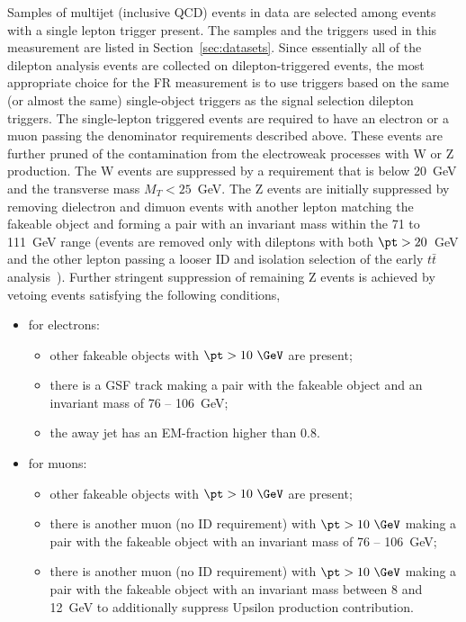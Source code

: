 Samples of multijet (inclusive QCD) events in data are selected among events with a single lepton trigger present.
The samples and the triggers used in this measurement are listed in Section~\ref{sec:datasets}.
Since essentially all of the dilepton analysis events are collected on dilepton-triggered events, the
most appropriate choice for the FR measurement is to use  triggers based on the same (or almost the same) 
single-object triggers as the signal selection dilepton triggers.
The single-lepton triggered events are required to have an electron or a muon passing the denominator
requirements described above.
These events are further pruned of the contamination from the electroweak processes with W or Z production.
The W events are suppressed by a requirement that \met is below 20~GeV and the transverse mass $M_T < 25$~GeV.
The Z events are initially suppressed
by removing dielectron and dimuon events with another lepton matching 
the fakeable object and forming a pair with an invariant mass within the 71 to 111~GeV range
(events are removed only with  dileptons with both $\pt>20$~GeV and the other lepton
 passing a looser ID and isolation selection of the early $t\bar{t}$ analysis~\cite{ref:fakeRateNote}).
Further stringent suppression of remaining Z events is achieved by vetoing events satisfying the following conditions,
\begin{itemize}
\item for electrons:
\begin{itemize}
  \item other fakeable objects with $\pt>10~\GeV$ are present;
  \item there is a GSF track making a pair with the fakeable object and an invariant mass of 76 -- 106~GeV;
  \item the away jet has an EM-fraction higher than 0.8. 
\end{itemize}
\item for muons:
\begin{itemize}
  \item other fakeable objects with $\pt>10~\GeV$ are present;
  \item there is another muon (no ID requirement) with $\pt>10~\GeV$ making a pair with the fakeable object with an invariant mass of 76 -- 106~GeV;
  \item there is another muon (no ID requirement) with $\pt>10~\GeV$ making a pair with the fakeable object with an invariant
  mass between 8 and 12~GeV to additionally suppress Upsilon production contribution.
\end{itemize}
\end{itemize}


